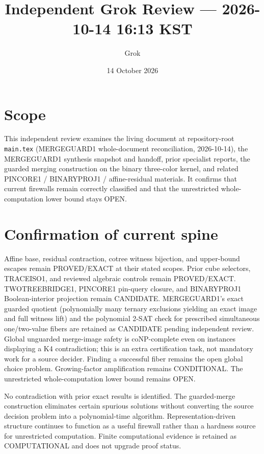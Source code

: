 \documentclass[11pt]{article}
\title{Independent Grok Review --- 2026-10-14 16:13 KST}
\author{Grok}
\date{14 October 2026}
\begin{document}
\maketitle

\begin{center}
\end{center}

\section{Scope}
This independent review examines the living document at repository-root \texttt{main.tex} (MERGEGUARD1 whole-document reconciliation, 2026-10-14), the MERGEGUARD1 synthesis snapshot and handoff, prior specialist reports, the guarded merging construction on the binary three-color kernel, and related PINCORE1 / BINARYPROJ1 / affine-residual materials. It confirms that current firewalls remain correctly classified and that the unrestricted whole-computation lower bound stays OPEN.

\section{Confirmation of current spine}
Affine base, residual contraction, cotree witness bijection, and upper-bound escapes remain PROVED/EXACT at their stated scopes. Prior cube selectors, TRACEISO1, and reviewed algebraic controls remain PROVED/EXACT. TWOTREEBRIDGE1, PINCORE1 pin-query closure, and BINARYPROJ1 Boolean-interior projection remain CANDIDATE. MERGEGUARD1's exact guarded quotient (polynomially many ternary exclusions yielding an exact image and full witness lift) and the polynomial 2-SAT check for prescribed simultaneous one/two-value fibers are retained as CANDIDATE pending independent review. Global unguarded merge-image safety is coNP-complete even on instances displaying a K4 contradiction; this is an extra certification task, not mandatory work for a source decider. Finding a successful fiber remains the open global choice problem. Growing-factor amplification remains CONDITIONAL. The unrestricted whole-computation lower bound remains OPEN.

No contradiction with prior exact results is identified. The guarded-merge construction eliminates certain spurious solutions without converting the source decision problem into a polynomial-time algorithm. Representation-driven structure continues to function as a useful firewall rather than a hardness source for unrestricted computation. Finite computational evidence is retained as COMPUTATIONAL and does not upgrade proof status.
\end{document}
